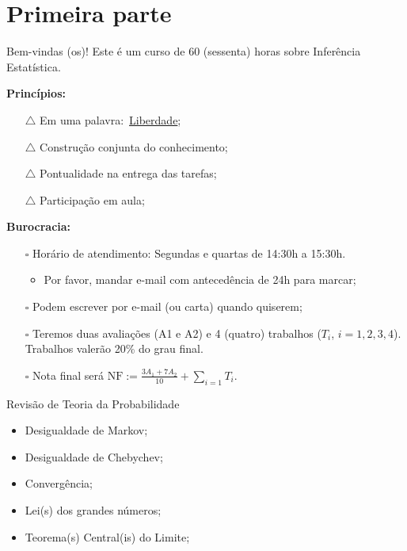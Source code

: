 \section*{Primeira parte}
\begin{frame}[t,plain]
\titlepage
\end{frame}
\begin{frame}{Bem-vindas (os)!}
Este é um curso de 60 (sessenta) horas sobre Inferência Estatística.

\textbf{Princípios:}
\begin{itemize}
  \item[$\triangle$] Em uma palavra:~\underline{Liberdade};
  \item[$\triangle$] Construção conjunta do conhecimento;
  \item[$\triangle$] Pontualidade na entrega das tarefas;
  \item[$\triangle$] Participação em aula;
\end{itemize}

\textbf{Burocracia:}
\begin{itemize}
 \item[$\square$] Horário de atendimento: Segundas e quartas de 14:30h a 15:30h.
 \begin{itemize}
  \item  Por favor, mandar e-mail com antecedência de 24h para marcar;
  \end{itemize} 
 \item[$\square$] Podem escrever por e-mail (ou carta) quando quiserem;
 \item[$\square$] Teremos duas avaliações (A1 e A2) e 4 (quatro) trabalhos ($T_i$, $i = 1,2,3,4$).
 Trabalhos valerão 20\% do grau final.
 \item[$\square$] Nota final será $\text{NF} := \frac{3A_1 + 7A_2}{10} + \sum_{i=1}T_i$.
\end{itemize}
\end{frame}
\begin{frame}{Revisão de Teoria da Probabilidade}
\begin{itemize}
 \item Desigualdade de Markov;
 \item Desigualdade de Chebychev;
  \item Convergência;
 \item Lei(s) dos grandes números;
 \item Teorema(s) Central(is) do Limite;
\end{itemize}
\end{frame}
